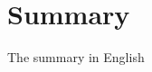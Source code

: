 \documentclass[../phdthesis.tex]{subfiles}
\begin{document}
\ifSubfilesClassLoaded{\backmatter}{}
\chapter{Summary}
The summary in English

\end{document}
